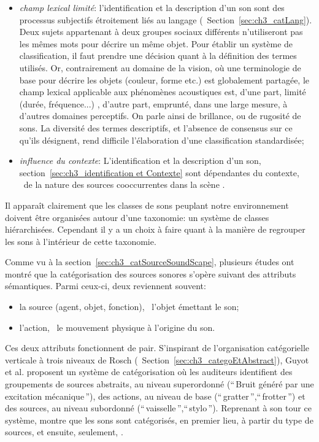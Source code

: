\begin{itemize}
\begin{itemize}
\item \emph{champ lexical limité}: l'identification et la description d'un son sont des processus subjectifs étroitement liés au langage (\cf~Section~\ref{sec:ch3_catLang}). Deux sujets appartenant à deux groupes sociaux différents n'utiliseront pas les mêmes mots pour décrire un même objet. Pour établir un système de classification, il faut prendre une décision quant à la définition des termes utilisés. Or, contrairement au domaine de la vision, où une terminologie de base pour décrire les objets (couleur, forme etc.) est globalement partagée, le champ lexical applicable aux phénomènes acoustiques est, d'une part, limité (durée, fréquence...) \citep{dubois2000categories}, d'autre part, emprunté, dans une large mesure, à d'autres domaines perceptifs. On parle ainsi de brillance, ou de rugosité de sons. La diversité des termes descriptifs, et l'absence de consensus sur ce qu'ils désignent, rend difficile l'élaboration d'une classification standardisée;
\item \emph{influence du contexte}: L'identification et la description d'un son, section~\ref{sec:ch3_identification et Contexte} sont dépendantes du contexte, \ie~de la nature des sources cooccurrentes dans la scène \citep{ballas1987interpreting,niessen2008disambiguating,gygi2011incongruency}.
\end{itemize}
\end{itemize}

Il apparaît clairement que les classes de sons peuplant notre environnement doivent être organisées autour d'une taxonomie: un système de classes hiérarchisées. Cependant il y a un choix à faire quant à la manière de regrouper les sons à l'intérieur de cette taxonomie.

Comme vu à la section~\ref{sec:ch3_catSourceSoundScape}, plusieurs études ont montré que la catégorisation des sources sonores s'opère suivant des attributs sémantiques. Parmi ceux-ci, deux reviennent souvent:

\begin{itemize}
\item la source (agent, objet, fonction), \ie~l'objet émettant le son;
\item l'action, \ie~le mouvement physique à l'origine du son.
\end{itemize} 

Ces deux attributs fonctionnent de pair. S'inspirant de l'organisation catégorielle verticale à trois niveaux de Rosch (\cf~Section~\ref{sec:ch3_categoEtAbstract}), Guyot et al. \citep{guyot1997} proposent un système de catégorisation où les auditeurs identifient des groupements de sources abstraits, au niveau superordonné (``\,Bruit généré par une excitation mécanique\,''), des actions, au niveau de base (``\,gratter\,'',``\,frotter\,'') et des sources, au niveau subordonné (``\,vaisselle\,'',``\,stylo\,''). Reprenant à son tour ce système, \citep{houix_lexical_2012} montre que les sons sont catégorisés, en premier lieu, à partir du type de sources, et ensuite, seulement,  .

